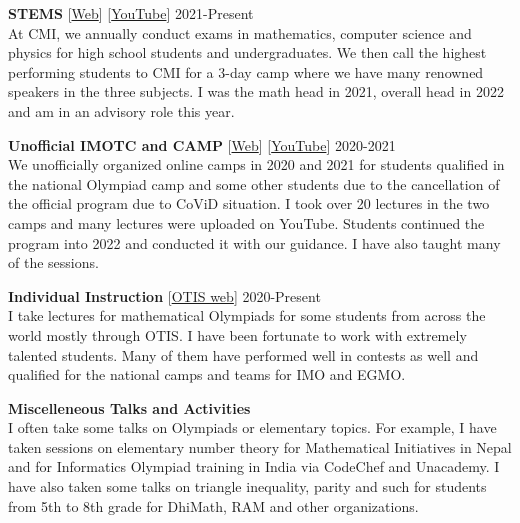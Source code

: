 \documentclass[margin,line, 10pt]{res}
\begin{document}
\begin{resume}
{\bf STEMS}{\hspace{1em} [\href{https://www.tessellate.cmi.ac.in/stems}{Web}]\hspace{0.4em} [\href{https://www.youtube.com/@TessellateCMI}{YouTube}]} \hfill 2021-Present\\
At CMI, we annually conduct exams in mathematics, computer science and physics for high school students and undergraduates. We then call the highest performing students to CMI for a 3-day camp where we have many renowned speakers in the three subjects. I was the math head in 2021, overall head in 2022 and am in an advisory role this year.

{\bf Unofficial IMOTC and CAMP}{\hspace{1em} [\href{https://sites.google.com/view/campamp/home}{Web}]\hspace{0.4em} [\href{https://www.youtube.com/@campforadvancedmathematica4861}{YouTube}]} \hfill 2020-2021 \\
We unofficially organized online camps in 2020 and 2021 for students qualified in the national Olympiad camp and some other students due to the cancellation of the official program due to CoViD situation. I took over 20 lectures in the two camps and many lectures were uploaded on YouTube. Students continued the program into 2022 and conducted it with our guidance. I have also taught many of the sessions.

{\bf Individual Instruction} \hspace{1em} [\href{https://web.evanchen.cc/otis.html}{OTIS web}]  \hfill 2020-Present\\
I take lectures for mathematical Olympiads for some students from across the world mostly through OTIS. I have been fortunate to work with extremely talented students. Many of them have performed well in contests as well and qualified for the national camps and teams for IMO and EGMO.

{\bf Miscelleneous Talks and Activities}\\
I often take some talks on Olympiads or elementary topics. For example, I have taken sessions on elementary number theory for Mathematical Initiatives in Nepal and for Informatics Olympiad training in India via CodeChef and Unacademy. I have also taken some talks on triangle inequality, parity and such for students from 5th to 8th grade for DhiMath, RAM and other organizations. 



\end{resume}
\end{document}

